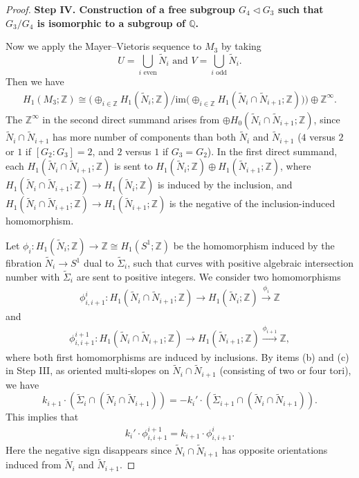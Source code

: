 \documentclass{amsart}
\numberwithin{equation}{section}
\theoremstyle{definition}
\begin{document}
\begin{proof}
\bigskip

{\bf Step IV. Construction of a free subgroup $G_4\vartriangleleft G_3$ such that $G_3/G_4$ is isomorphic to a subgroup of $\mathbb{Q}$.}

Now we apply the Mayer–Vietoris sequence to $M_3$ by taking
$$U=\bigcup_{i\text{\ even}}\tilde{N}_i\text{\ and\ }V=\bigcup_{i\text{\ odd}}\tilde{N}_i.$$
Then we have 
\begin{align}\label{7.1}
H_1(M_3;\mathbb{Z})\cong \Big( \oplus_{i\in \mathbb{Z}} H_1(\tilde{N}_i;\mathbb{Z})/\text{im}\big(\oplus_{i\in \mathbb{Z}}H_1(\tilde{N}_i\cap\tilde{N}_{i+1};\mathbb{Z})\big)\Big)\oplus \mathbb{Z}^{\infty}.
\end{align}
The $\mathbb{Z}^{\infty}$ in the second direct summand arises from
$\oplus H_0(\tilde{N}_i\cap \tilde{N}_{i+1};\mathbb{Z})$, since $\tilde{N}_i\cap \tilde{N}_{i+1}$ has more number of components than both $\tilde{N}_i$ and $\tilde{N}_{i+1}$ ($4$ versus $2$ or $1$ if $[G_2:G_3]=2$, and $2$ versus $1$ if $G_3=G_2$).
In the first direct summand, each $H_1(\tilde{N}_i\cap  \tilde{N}_{i+1};\mathbb{Z})$ is sent to $H_1(\tilde{N}_i;\mathbb{Z})\oplus H_1(\tilde{N}_{i+1};\mathbb{Z})$, where $H_1(\tilde{N}_i\cap \tilde{N}_{i+1};\mathbb{Z})\to H_1(\tilde{N}_i;\mathbb{Z})$ is induced by the inclusion, and $H_1(\tilde{N}_i\cap \tilde{N}_{i+1};\mathbb{Z})\to H_1(\tilde{N}_{i+1};\mathbb{Z})$ is the negative of the inclusion-induced homomorphism. 

Let $\phi_i:H_1(\tilde{N}_i;\mathbb{Z})\to \mathbb{Z}\cong H_1(S^1;\mathbb{Z})$ be the homomorphism induced by the fibration $\tilde{N}_i\to S^1$ dual to $\tilde{\Sigma}_i$, such that curves with positive algebraic intersection number with $\tilde{\Sigma}_i$ are sent to positive integers. We consider two homomorphisms 
\begin{align}\label{7.2}
\phi_{i,i+1}^{i}:H_1(\tilde{N}_i\cap \tilde{N}_{i+1};\mathbb{Z})\to H_1(\tilde{N}_i;\mathbb{Z})\xrightarrow{\phi_i}\mathbb{Z}
\end{align} and
\begin{align}\label{7.3}
\phi_{i,i+1}^{i+1}:H_1(\tilde{N}_i\cap \tilde{N}_{i+1};\mathbb{Z})\to H_1(\tilde{N}_{i+1};\mathbb{Z})\xrightarrow{\phi_{i+1}}\mathbb{Z},
\end{align} 
where both first homomorphisms are induced by inclusions. By items (b) and (c) in Step III, as oriented multi-slopes on $\tilde{N}_i\cap \tilde{N}_{i+1}$ (consisting of two or four tori), we have 
$$k_{i+1}\cdot (\tilde{\Sigma}_i\cap (\tilde{N}_i\cap \tilde{N}_{i+1}))=-k_i'\cdot (\tilde{\Sigma}_{i+1}\cap (\tilde{N}_i\cap \tilde{N}_{i+1})).$$
This implies that 
\begin{align}\label{7.4}
k_i'\cdot \phi_{i,i+1}^{i+1}=k_{i+1}\cdot \phi_{i,i+1}^{i}.
\end{align}
Here the negative sign disappears since $\tilde{N}_i\cap \tilde{N}_{i+1}$ has opposite orientations induced from $\tilde{N}_i$ and $\tilde{N}_{i+1}$.



\end{proof}
\end{document}
